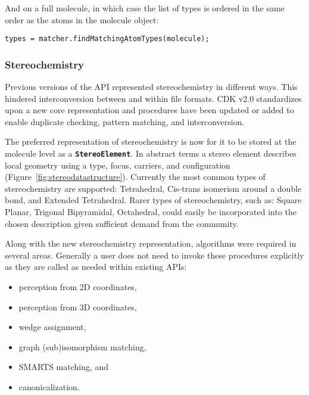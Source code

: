 \documentclass[doublespacing]{bmcart}
\def \cdkversion {v2.0}
\begin{document}
And on a full molecule, in which case the list of types is ordered in the same
order as the atoms in the molecule object:

\vspace{0.2cm}
\begin{verbatim}
types = matcher.findMatchingAtomTypes(molecule);
\end{verbatim}
\vspace{0.2cm}

  \subsubsection*{Stereochemistry}

  Previous versions of the API represented stereochemistry in different ways. This hindered
  interconversion between and within file formats. CDK \cdkversion{} standardizes
  upon a new core representation and procedures have been updated or added to
  enable duplicate checking, pattern matching, and interconversion.

  The preferred representation of stereochemistry is now for it to be stored at the molecule
  level as a \texttt{\textbf{StereoElement}}. In abstract terms a stereo element describes local
  geometry using a type, focus, carriers, and configuration (Figure~\ref{fig:stereodatastructure}).
  Currently the most common types of stereochemistry are supported: Tetrahedral, Cis-trans isomerism 
  around a double bond, and Extended Tetrahedral. Rarer types of stereochemistry, such as: Square 
  Planar, Trigonal Bipyramidal, Octahedral, could easily be incorporated into the chosen description 
   given sufficient demand from the community.


  Along with the new stereochemistry representation, algorithms were required in several areas. Generally
  a user does not need to invoke these procedures explicitly as they are called as needed within existing
  APIs:

\vspace{0.2cm}
  \begin{itemize}
   \item perception from 2D coordinates,
   \item perception from 3D coordinates,
   \item wedge assignment,
   \item graph (sub)isomorphism matching,
   \item SMARTS matching, and
   \item canonicalization.
  \end{itemize}
\vspace{0.2cm}
\end{document}
